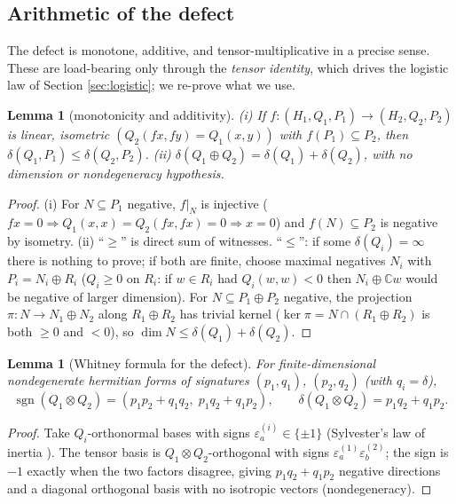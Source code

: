 \documentclass[11pt,reqno]{amsart}
\newtheorem{lemma}[theorem]{Lemma}
\theoremstyle{definition}
\newcommand{\C}{\mathbb{C}}
\DeclareMathOperator{\sgn}{sgn}
\begin{document}
\subsection{Arithmetic of the defect}
The defect is monotone, additive, and tensor-multiplicative in a precise sense.
These are load-bearing only through the \emph{tensor identity}, which drives the
logistic law of Section \ref{sec:logistic}; we re-prove what we use.

\begin{lemma}[monotonicity and additivity]\label{lem:mono-add}
\textup{(i)} If \(f\colon(H_1,Q_1,P_1)\to(H_2,Q_2,P_2)\) is linear, isometric
\((Q_2(fx,fy)=Q_1(x,y))\) with \(f(P_1)\subseteq P_2\), then
\(\delta(Q_1,P_1)\leq\delta(Q_2,P_2)\). \textup{(ii)}
\(\delta(Q_1\oplus Q_2)=\delta(Q_1)+\delta(Q_2)\), with no dimension or
nondegeneracy hypothesis.
\end{lemma}

\begin{proof}
(i) For \(N\subseteq P_1\) negative, \(f|_N\) is injective (\(fx=0\Rightarrow
Q_1(x,x)=Q_2(fx,fx)=0\Rightarrow x=0\)) and \(f(N)\subseteq P_2\) is negative by
isometry. (ii) ``\(\geq\)'' is direct sum of witnesses. ``\(\leq\)'': if some
\(\delta(Q_i)=\infty\) there is nothing to prove; if both are finite, choose
maximal negatives \(N_i\) with \(P_i=N_i\oplus R_i\) (\(Q_i\geq0\) on \(R_i\):
if \(w\in R_i\) had \(Q_i(w,w)<0\) then \(N_i\oplus\C w\) would be negative of
larger dimension). For \(N\subseteq P_1\oplus P_2\) negative, the projection
\(\pi\colon N\to N_1\oplus N_2\) along \(R_1\oplus R_2\) has trivial kernel
(\(\ker\pi=N\cap(R_1\oplus R_2)\) is both \(\geq0\) and \(<0\)), so
\(\dim N\leq\delta(Q_1)+\delta(Q_2)\).
\end{proof}

\begin{lemma}[Whitney formula for the defect]\label{lem:whitney}
For finite-dimensional nondegenerate hermitian forms of signatures
\((p_1,q_1)\), \((p_2,q_2)\) (with \(q_i=\delta\)),
\[
\sgn(Q_1\otimes Q_2)=(p_1p_2+q_1q_2,\;p_1q_2+q_1p_2),
\qquad
\delta(Q_1\otimes Q_2)=p_1q_2+q_1p_2 .
\]
\end{lemma}

\begin{proof}
Take \(Q_i\)-orthonormal bases with signs \(\varepsilon^{(i)}_a\in\{\pm1\}\)
(Sylvester's law of inertia \cite{Gantmacher}). The tensor basis is \(Q_1\otimes Q_2\)-orthogonal with signs
\(\varepsilon^{(1)}_a\varepsilon^{(2)}_b\); the sign is \(-1\) exactly when the
two factors disagree, giving \(p_1q_2+q_1p_2\) negative directions and a
diagonal orthogonal basis with no isotropic vectors (nondegeneracy).
\end{proof}
\end{document}

